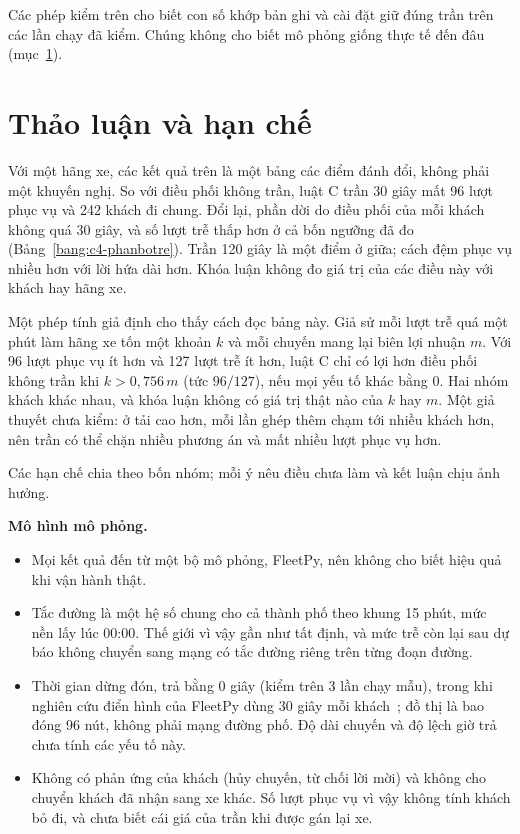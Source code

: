 Các phép kiểm trên cho biết con số khớp bản ghi và cài đặt giữ đúng trần trên các lần chạy đã kiểm. Chúng không cho
biết mô phỏng giống thực tế đến đâu (mục~\ref{muc:c4-thaoluan}).

\section{Thảo luận và hạn chế}
\label{muc:c4-thaoluan}

Với một hãng xe, các kết quả trên là một bảng các điểm đánh đổi, không phải một khuyến nghị. So với điều phối không
trần, luật C trần 30 giây mất 96 lượt phục vụ và 242 khách đi chung. Đổi lại, phần dời do điều phối của mỗi khách
không quá 30 giây, và số lượt trễ thấp hơn ở cả bốn ngưỡng đã đo (Bảng~\ref{bang:c4-phanbotre}). Trần 120 giây là một điểm ở giữa; cách đệm phục vụ
nhiều hơn với lời hứa dài hơn. Khóa luận không đo giá trị của các điều này với khách hay hãng xe.

Một phép tính giả định cho thấy cách đọc bảng này. Giả sử mỗi lượt trễ quá một phút làm hãng xe tốn một khoản $k$ và
mỗi chuyến mang lại biên lợi nhuận $m$. Với 96 lượt phục vụ ít hơn và 127 lượt trễ ít hơn, luật C chỉ có lợi hơn điều
phối không trần khi $k > 0{,}756\,m$ (tức $96/127$), nếu mọi yếu tố khác bằng 0. Hai nhóm khách khác nhau, và khóa
luận không có giá trị thật nào của $k$ hay $m$. Một giả thuyết chưa kiểm: ở tải cao hơn, mỗi lần ghép thêm chạm tới
nhiều khách hơn, nên trần có thể chặn nhiều phương án và mất nhiều lượt phục vụ hơn.

Các hạn chế chia theo bốn nhóm; mỗi ý nêu điều chưa làm và kết luận chịu ảnh hưởng.

\textbf{Mô hình mô phỏng.}
\begin{itemize}[leftmargin=1.2cm,itemsep=2pt,topsep=3pt]
\item Mọi kết quả đến từ một bộ mô phỏng, FleetPy, nên không cho biết hiệu quả khi vận hành thật.
\item Tắc đường là một hệ số chung cho cả thành phố theo khung 15 phút, mức nền lấy lúc 00:00. Thế giới vì vậy gần
như tất định, và mức trễ còn lại sau dự báo không chuyển sang mạng có tắc đường riêng trên từng đoạn đường.
\item Thời gian dừng đón, trả bằng 0 giây (kiểm trên 3 lần chạy mẫu), trong khi nghiên cứu điển hình của FleetPy dùng
30 giây mỗi khách~\cite{engelhardt2026}; đồ thị là bao đóng 96 nút, không phải mạng đường phố. Độ dài chuyến và độ
lệch giờ trả chưa tính các yếu tố này.
\item Không có phản ứng của khách (hủy chuyến, từ chối lời mời) và không cho chuyển khách đã nhận sang xe khác. Số
lượt phục vụ vì vậy không tính khách bỏ đi, và chưa biết cái giá của trần khi được gán lại xe.
\end{itemize}

